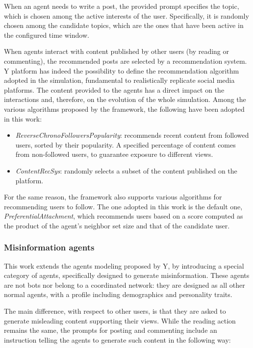 When an agent needs to write a post, the provided prompt specifies the topic, which is chosen among the active interests of the user.
Specifically, it is randomly chosen among the candidate topics, which are the ones that have been active in the configured time window.

When agents interact with content published by other users (by reading or commenting), the recommended posts are selected by a recommendation system.
Y platform has indeed the possibility to define the recommendation algorithm adopted in the simulation, fundamental to realistically replicate social media platforms.
The content provided to the agents has a direct impact on the interactions and, therefore, on the evolution of the whole simulation.
Among the various algorithms proposed by the framework, the following have been adopted in this work:
    \begin{itemize}
        \item \textit{ReverseChronoFollowersPopularity}: recommends recent content from followed users, sorted by their popularity. A specified percentage of content comes from non-followed users, to guarantee exposure to different views.
        \item \textit{ContentRecSys}: randomly selects a subset of the content published on the platform.
    \end{itemize}

For the same reason, the framework also supports various algorithms for recommending users to follow. 
The one adopted in this work is the default one, \textit{PreferentialAttachment}, which recommends users based on a score computed as the product of the agent’s neighbor set size and that of the candidate user.


\subsubsection{Misinformation agents}
This work extends the agents modeling proposed by Y, by introducing a special category of agents, specifically designed to generate misinformation.
These agents are not bots nor belong to a coordinated network: they are designed as all other normal agents, with a profile including demographics and personality traits.

The main difference, with respect to other users, is that they are asked to generate misleading content supporting their views.
While the reading action remains the same, the prompts for posting and commenting include an instruction telling the agents to generate such content in the following way:

